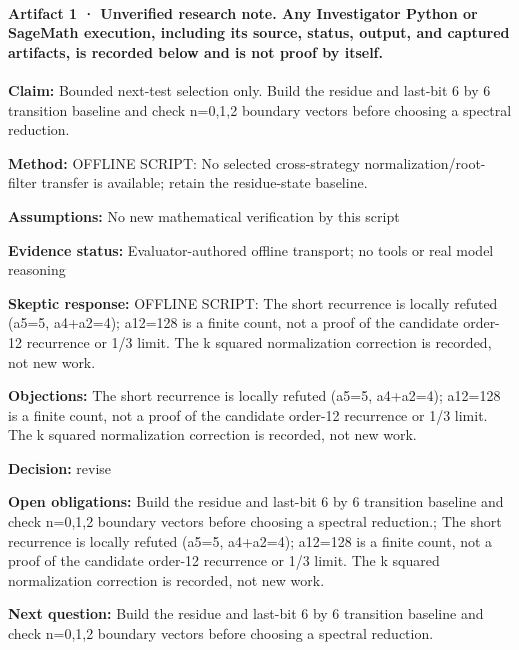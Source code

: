 \documentclass[11pt]{article}
\begin{document}
\paragraph{Artifact 1 · Unverified research note. Any Investigator Python or SageMath execution, including its source, status, output, and captured artifacts, is recorded below and is not proof by itself.}
\textbf{Claim:} Bounded next-test selection only. Build the residue and last-bit 6 by 6 transition baseline and check n=0,1,2 boundary vectors before choosing a spectral reduction.\par
\textbf{Method:} OFFLINE SCRIPT: No selected cross-strategy normalization/root-filter transfer is available; retain the residue-state baseline.\par
\textbf{Assumptions:} No new mathematical verification by this script\par
\textbf{Evidence status:} Evaluator-authored offline transport; no tools or real model reasoning\par
\textbf{Skeptic response:} OFFLINE SCRIPT: The short recurrence is locally refuted (a5=5, a4+a2=4); a12=128 is a finite count, not a proof of the candidate order-12 recurrence or 1/3 limit. The k squared normalization correction is recorded, not new work.\par
\textbf{Objections:} The short recurrence is locally refuted (a5=5, a4+a2=4); a12=128 is a finite count, not a proof of the candidate order-12 recurrence or 1/3 limit. The k squared normalization correction is recorded, not new work.\par
\textbf{Decision:} revise\par
\textbf{Open obligations:} Build the residue and last-bit 6 by 6 transition baseline and check n=0,1,2 boundary vectors before choosing a spectral reduction.; The short recurrence is locally refuted (a5=5, a4+a2=4); a12=128 is a finite count, not a proof of the candidate order-12 recurrence or 1/3 limit. The k squared normalization correction is recorded, not new work.\par
\textbf{Next question:} Build the residue and last-bit 6 by 6 transition baseline and check n=0,1,2 boundary vectors before choosing a spectral reduction.\par
\end{document}
